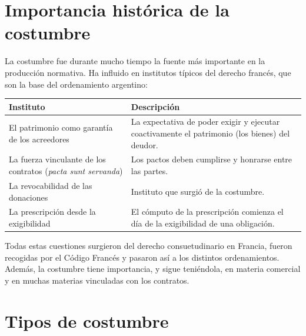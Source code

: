 \documentclass[12pt,oneside]{book}
\begin{document}
\section{Importancia histórica de la costumbre}

La costumbre fue durante mucho tiempo la fuente más importante en la producción normativa. Ha influido en institutos típicos del derecho francés, que son la base del ordenamiento argentino:

\begin{table}[H]
\centering
\begin{tabularx}{\textwidth}{>{\raggedright\arraybackslash}p{} >{\raggedright\arraybackslash}X}
\toprule
\textbf{Instituto} & \textbf{Descripción} \\
\midrule
El patrimonio como garantía de los acreedores & La expectativa de poder exigir y ejecutar coactivamente el patrimonio (los bienes) del deudor. \\
\addlinespace
La fuerza vinculante de los contratos (\textit{pacta sunt servanda}) & Los pactos deben cumplirse y honrarse entre las partes. \\
\addlinespace
La revocabilidad de las donaciones & Instituto que surgió de la costumbre. \\
\addlinespace
La prescripción desde la exigibilidad & El cómputo de la prescripción comienza el día de la exigibilidad de una obligación. \\
\bottomrule
\end{tabularx}
\end{table}

Todas estas cuestiones surgieron del derecho consuetudinario en Francia, fueron recogidas por el Código Francés y pasaron así a los distintos ordenamientos. Además, la costumbre tiene importancia, y sigue teniéndola, en materia comercial y en muchas materias vinculadas con los contratos.

\section{Tipos de costumbre}
\end{document}
